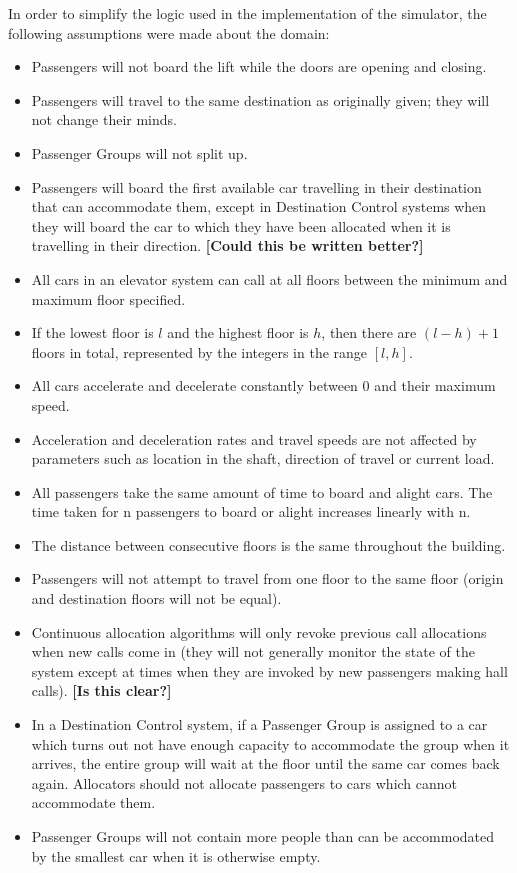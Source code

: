 \documentclass{UoYCSproject}
\begin{document}
In order to simplify the logic used in the implementation of the simulator, the following assumptions were made about the domain:
	\begin{itemize}
		\item Passengers will not board the lift while the doors are opening and closing.
		\item Passengers will travel to the same destination as originally given; they will not change their minds.
		\item Passenger Groups will not split up.
		\item Passengers will board the first available car travelling in their destination that can accommodate them, except in Destination Control systems when they will board the car to which they have been allocated when it is travelling in their direction.  \textbf{[Could this be written better?]}
		\item All cars in an elevator system can call at all floors between the minimum and maximum floor specified.
		\item If the lowest floor is $l$ and the highest floor is $h$, then there are $(l-h)+1$ floors in total, represented by the integers in the range $[l, h]$.
		\item All cars accelerate and decelerate constantly between 0 and their maximum speed.
		\item Acceleration and deceleration rates and travel speeds are not affected by parameters such as location in the shaft, direction of travel or current load.
		\item All passengers take the same amount of time to board and alight cars.  The time taken for n passengers to board or alight increases linearly with n.
		\item The distance between consecutive floors is the same throughout the building.
		\item Passengers will not attempt to travel from one floor to the same floor (origin and destination floors will not be equal).
		\item Continuous allocation algorithms will only revoke previous call allocations when new calls come in (they will not generally monitor the state of the system except at times when they are invoked by new passengers making hall calls). \textbf{[Is this clear?]}
		\item In a Destination Control system, if a Passenger Group is assigned to a car which turns out not have enough capacity to accommodate the group when it arrives, the entire group will wait at the floor until the same car comes back again.  Allocators should not allocate passengers to cars which cannot accommodate them.
		\item Passenger Groups will not contain more people than can be accommodated by the smallest car when it is otherwise empty.
	\end{itemize}
\end{document}
